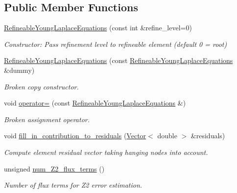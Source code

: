 \subsection*{Public Member Functions}
\begin{DoxyCompactItemize}
\item 
\hyperlink{classoomph_1_1RefineableYoungLaplaceEquations_a2a063bf86fb20b2db8cc962947663da2}{Refineable\+Young\+Laplace\+Equations} (const int \&refine\+\_\+level=0)
\begin{DoxyCompactList}\small\item\em Constructor\+: Pass refinement level to refineable element (default 0 = root) \end{DoxyCompactList}\item 
\hyperlink{classoomph_1_1RefineableYoungLaplaceEquations_ab3b932f2c303edef5ac1b603f7ffa554}{Refineable\+Young\+Laplace\+Equations} (const \hyperlink{classoomph_1_1RefineableYoungLaplaceEquations}{Refineable\+Young\+Laplace\+Equations} \&dummy)
\begin{DoxyCompactList}\small\item\em Broken copy constructor. \end{DoxyCompactList}\item 
void \hyperlink{classoomph_1_1RefineableYoungLaplaceEquations_ac03b660ba90fe5fd1ea5d734f6a41aa7}{operator=} (const \hyperlink{classoomph_1_1RefineableYoungLaplaceEquations}{Refineable\+Young\+Laplace\+Equations} \&)
\begin{DoxyCompactList}\small\item\em Broken assignment operator. \end{DoxyCompactList}\item 
void \hyperlink{classoomph_1_1RefineableYoungLaplaceEquations_ae9a050a3b61cb89b54907a0efd9bcfab}{fill\+\_\+in\+\_\+contribution\+\_\+to\+\_\+residuals} (\hyperlink{classoomph_1_1Vector}{Vector}$<$ double $>$ \&residuals)
\begin{DoxyCompactList}\small\item\em Compute element residual vector taking hanging nodes into account. \end{DoxyCompactList}\item 
unsigned \hyperlink{classoomph_1_1RefineableYoungLaplaceEquations_aef39cb1a9e6f4b117b840211fa8570cc}{num\+\_\+\+Z2\+\_\+flux\+\_\+terms} ()
\begin{DoxyCompactList}\small\item\em Number of \textquotesingle{}flux\textquotesingle{} terms for Z2 error estimation. \end{DoxyCompactList}\item 

\end{DoxyCompactItemize}
